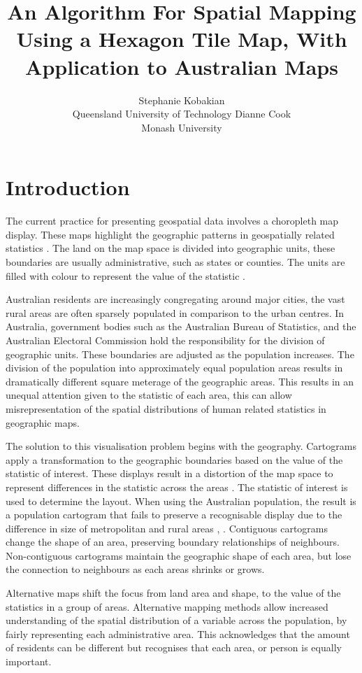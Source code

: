 \documentclass[
]{jss}
\author{
Stephanie Kobakian\\Queensland University of Technology \And Dianne Cook\\Monash University
}
\title{An Algorithm For Spatial Mapping Using a Hexagon Tile Map, With
Application to Australian Maps}
\begin{document}
\hypertarget{introduction}{%
\section{Introduction}\label{introduction}}

The current practice for presenting geospatial data involves a
choropleth map display. These maps highlight the geographic patterns in
geospatially related statistics \citep{SAMGIS}. The land on the map
space is divided into geographic units, these boundaries are usually
administrative, such as states or counties. The units are filled with
colour to represent the value of the statistic \citep{EI}.

Australian residents are increasingly congregating around major cities,
the vast rural areas are often sparsely populated in comparison to the
urban centres. In Australia, government bodies such as the Australian
Bureau of Statistics, and the Australian Electoral Commission hold the
responsibility for the division of geographic units. These boundaries
are adjusted as the population increases. The division of the population
into approximately equal population areas results in dramatically
different square meterage of the geographic areas. This results in an
unequal attention given to the statistic of each area, this can allow
misrepresentation of the spatial distributions of human related
statistics in geographic maps.

The solution to this visualisation problem begins with the geography.
Cartograms apply a transformation to the geographic boundaries based on
the value of the statistic of interest. These displays result in a
distortion of the map space to represent differences in the statistic
across the areas \citep{ACCAC}. The statistic of interest is used to
determine the layout. When using the Australian population, the result
is a population cartogram that fails to preserve a recognisable display
due to the difference in size of metropolitan and rural areas
\citep{ACTUC}, \citep{GOINO}. Contiguous cartograms change the shape of
an area, preserving boundary relationships of neighbours. Non-contiguous
cartograms maintain the geographic shape of each area, but lose the
connection to neighbours as each areas shrinks or grows.

Alternative maps shift the focus from land area and shape, to the value
of the statistics in a group of areas. Alternative mapping methods allow
increased understanding of the spatial distribution of a variable across
the population, by fairly representing each administrative area. This
acknowledges that the amount of residents can be different but
recognises that each area, or person is equally important.
\end{document}
